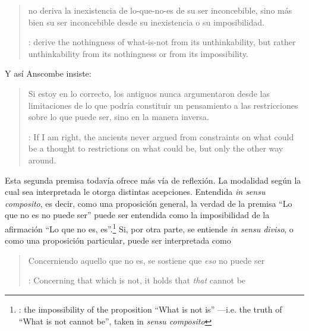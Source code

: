 \blockquote[{\cite[vii]{anscombe1981parmenides}}:  derive the
nothingness of what-is-not from its unthinkability, but rather unthinkability
from its nothingness or from its impossibility.]{no deriva la inexistencia de
  lo-que-no-es de su ser inconcebible, sino más bien su ser inconcebible desde
  su inexistencia o su imposibilidad.} Y así Anscombe insiste:
\blockquote[{\cite[viii]{anscombe1981parmenides}: If I am right, the ancients
  never argued from constraints on what could be a thought to restrictions on
  what could be, but only the other way around.}]{Si estoy en lo correcto, los
  antiguos nunca argumentaron desde las limitaciones de lo que podría constituir
  un pensamiento a las restricciones sobre lo que puede ser, sino en la manera
  inversa.}

Esta segunda premisa todavía ofrece más vía de reflexión. La modalidad según la
cual sea interpretada le otorga distintas acepciones. Entendida \emph{in sensu
  composito}, es decir, como una proposición general, la verdad de la premisa
\enquote{Lo que no es no puede ser} puede ser entendida como la imposibilidad de
la afirmación \enquote{Lo que no es,
  es}.\footnote{\cite[Cf.~][vii]{anscombe1981parmenides}: \textelp{} the
  impossibility of the proposition ``What is not is'' ---i.e. the truth of
  ``What is not cannot be'', taken in \emph{sensu composito}} Si, por otra
parte, se entiende \emph{in sensu diviso}, o como una proposición particular,
puede ser interpretada como \blockquote[{\cite[3]{anscombe1981parmenides:pmc}}:
Concerning that which is not, it holds that \emph{that} cannot be]{Concerniendo
  aquello que no es, se sostiene que \emph{eso} no puede ser}.

